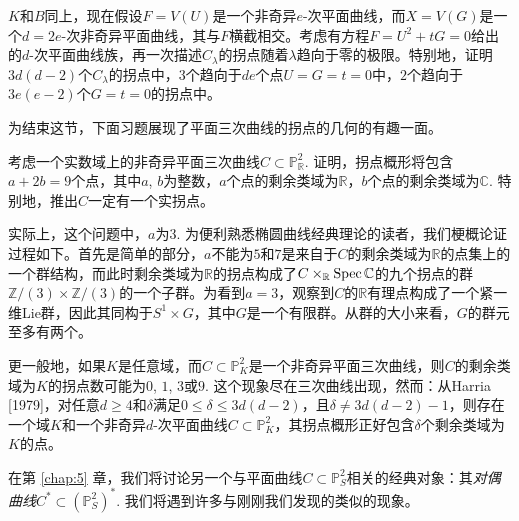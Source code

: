 \nottran

\begin{exe}\label{exe:4.12}
	$K$和$B$同上，现在假设$F=V(U)$是一个非奇异$e$-次平面曲线，而$X=V(G)$是一个$d=2e$-次非奇异平面曲线，其与$F$横截相交。考虑有方程$F=U^2+tG=0$给出的$d$-次平面曲线族，再一次描述$C_\lambda$的拐点随着$\lambda$趋向于零的极限。特别地，证明$3d(d-2)$个$C_\lambda$的拐点中，$3$个趋向于$de$个点$U=G=t=0$中，$2$个趋向于$3e(e-2)$个$G=t=0$的拐点中。
\end{exe}

\nottran

为结束这节，下面习题展现了平面三次曲线的拐点的几何的有趣一面。

\begin{exe}\label{exe:4.13}
	考虑一个实数域上的非奇异平面三次曲线$C\subset \mathbb P_{\mathbb R}^2$. 证明，拐点概形将包含$a+2b=9$个点，其中$a$, $b$为整数，$a$个点的剩余类域为$\mathbb R$，$b$个点的剩余类域为$\mathbb C$. 特别地，推出$C$一定有一个实拐点。
\end{exe}

实际上，这个问题中，$a$为$3$. 为便利熟悉椭圆曲线经典理论的读者，我们梗概论证过程如下。首先是简单的部分，$a$不能为$5$和$7$是来自于$C$的剩余类域为$\mathbb R$的点集上的一个群结构，而此时剩余类域为$\mathbb R$的拐点构成了$C\times_{\mathbb R}\operatorname{Spec} \mathbb C$的九个拐点的群$\mathbb Z/(3)\times \mathbb Z/(3)$的一个子群。为看到$a=3$，观察到$C$的$\mathbb R$有理点构成了一个紧一维Lie群，因此其同构于$S^1\times G$，其中$G$是一个有限群。从群的大小来看，$G$的群元至多有两个。

更一般地，如果$K$是任意域，而$C\subset \mathbb P_K^2$是一个非奇异平面三次曲线，则$C$的剩余类域为$K$的拐点数可能为$0$, $1$, $3$或$9$. 这个现象尽在三次曲线出现，然而：从Harria [1979]，对任意$d\geq 4$和$\delta$满足$0\leq \delta\leq 3d(d-2)$，且$\delta\neq 3d(d-2)-1$，则存在一个域$K$和一个非奇异$d$-次平面曲线$C\subset \mathbb P_K^2$，其拐点概形正好包含$\delta$个剩余类域为$K$的点。

在第 \ref{chap:5} 章，我们将讨论另一个与平面曲线$C\subset \mathbb P_S^2$相关的经典对象：其\textit{对偶曲线}$C^*\subset (\mathbb P_S^2)^*$. 我们将遇到许多与刚刚我们发现的类似的现象。